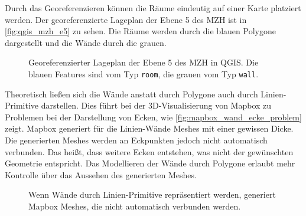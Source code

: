 Durch das Georeferenzieren können die Räume eindeutig auf einer Karte platziert werden.
Der georeferenzierte Lageplan der Ebene 5 des MZH ist in \autoref{fig:qgis_mzh_e5} zu sehen.
Die Räume werden durch die blauen Polygone dargestellt und die Wände durch die grauen.

\begin{figure}
    \centering
    \caption{Georeferenzierter Lageplan der Ebene 5 des MZH in QGIS.\@ %
    Die blauen Features sind vom Typ \texttt{room}, die grauen vom Typ \texttt{wall}.}
    \label{fig:qgis_mzh_e5}
\end{figure}

Theoretisch ließen sich die Wände anstatt durch Polygone auch durch Linien-Primitive darstellen.
Dies führt bei der 3D-Visualisierung von Mapbox zu Problemen bei der Darstellung von Ecken, wie \autoref{fig:mapbox_wand_ecke_problem} zeigt.
Mapbox generiert für die Linien-Wände Meshes mit einer gewissen Dicke.
Die generierten Meshes werden an Eckpunkten jedoch nicht automatisch verbunden.
Das heißt, dass weitere Ecken entstehen, was nicht der gewünschten Geometrie entspricht.
Das Modellieren der Wände durch Polygone erlaubt mehr Kontrolle über das Aussehen des generierten Meshes.

\begin{figure}
    \centering
    \vspace{2em}
    \caption{Wenn Wände durch Linien-Primitive repräsentiert werden, generiert Mapbox Meshes, die nicht automatisch verbunden werden.}
    \label{fig:mapbox_wand_ecke_problem}
\end{figure}

